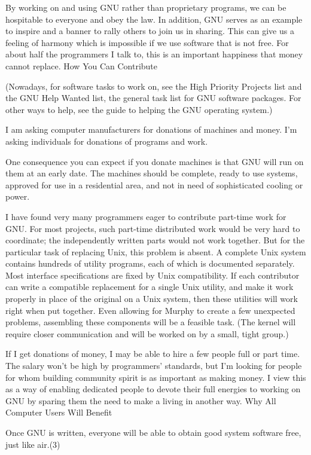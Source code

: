 By working on and using GNU rather than proprietary programs, we can be hospitable to everyone and obey the law. In addition, GNU serves as an example to inspire and a banner to rally others to join us in sharing. This can give us a feeling of harmony which is impossible if we use software that is not free. For about half the programmers I talk to, this is an important happiness that money cannot replace.
How You Can Contribute

(Nowadays, for software tasks to work on, see the High Priority Projects list and the GNU Help Wanted list, the general task list for GNU software packages. For other ways to help, see the guide to helping the GNU operating system.)

I am asking computer manufacturers for donations of machines and money. I'm asking individuals for donations of programs and work.

One consequence you can expect if you donate machines is that GNU will run on them at an early date. The machines should be complete, ready to use systems, approved for use in a residential area, and not in need of sophisticated cooling or power.

I have found very many programmers eager to contribute part-time work for GNU. For most projects, such part-time distributed work would be very hard to coordinate; the independently written parts would not work together. But for the particular task of replacing Unix, this problem is absent. A complete Unix system contains hundreds of utility programs, each of which is documented separately. Most interface specifications are fixed by Unix compatibility. If each contributor can write a compatible replacement for a single Unix utility, and make it work properly in place of the original on a Unix system, then these utilities will work right when put together. Even allowing for Murphy to create a few unexpected problems, assembling these components will be a feasible task. (The kernel will require closer communication and will be worked on by a small, tight group.)

If I get donations of money, I may be able to hire a few people full or part time. The salary won't be high by programmers' standards, but I'm looking for people for whom building community spirit is as important as making money. I view this as a way of enabling dedicated people to devote their full energies to working on GNU by sparing them the need to make a living in another way.
Why All Computer Users Will Benefit

Once GNU is written, everyone will be able to obtain good system software free, just like air.(3)


